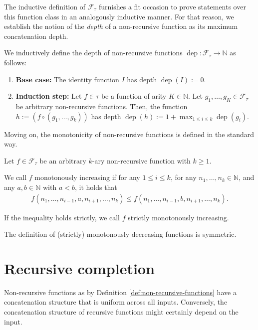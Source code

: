 
The inductive definition of $\mathcal{F}_{\tau}$ furnishes a fit occasion to prove statements over this function class in an analogously inductive manner.
For that reason, we establish the notion of the \textit{depth} of a non-recursive function as its maximum concatenation depth.

\begin{definition}
	\label{def:non-recursive-functions-depth}
	We inductively define the depth of non-recursive functions $\operatorname{dep}:\mathcal{F}_{\tau}\to\mathbb{N}$ as follows:
	\begin{enumerate}
		\item \textbf{Base case:} The identity function $I$ has depth $\operatorname{dep}(I):=0$. 
		\item \textbf{Induction step:} Let $f\in\tau$ be a function of arity $K\in\mathbb{N}$. Let $g_1,\dots,g_K\in\mathcal{F}_{\tau}$ be arbitrary non-recursive functions. Then, the function $h:=(f\circ(g_1,\dots,g_k))$ has depth $\operatorname{dep}(h):=1+\max_{1\leq i\leq k}\operatorname{dep}(g_i)$.
	\end{enumerate}
\end{definition}

Moving on, the monotonicity of non-recursive functions is defined in the standard way.
\begin{definition}
	\label{def:non-recursive-functions-monotonous}
	Let $f\in \mathcal{F}_{\tau}$ be an arbitrary $k$-ary non-recursive function with $k\geq 1$.
	
	We call $f$ monotonously increasing if for any $1\leq i\leq k$, for any $n_1,\dots,n_k\in \mathbb{N}$, and any $a,b\in\mathbb{N}$ with $a<b$, it holds that
	\begin{align*}
		f(n_1,\dots,n_{i-1},a,n_{i+1},\dots,n_k) \leq f(n_1,\dots,n_{i-1},b,n_{i+1},\dots,n_k).
	\end{align*}
	
	If the inequality holds strictly, we call $f$ strictly monotonously increasing.
	
	The definition of (strictly) monotonously decreasing functions is symmetric.
\end{definition}

\section{Recursive completion}
\label{sec:recursive-completion}
Non-recursive functions as by Definition \ref{def:non-recursive-functions} have a concatenation structure that is uniform across all inputs. 
Conversely, the concatenation structure of recursive functions might certainly depend on the input.

